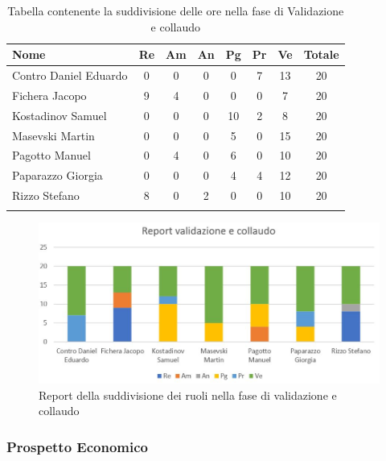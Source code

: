 \documentclass[../piano_di_progetto.tex]{subfiles}
\begin{document}
\begin{center}
	\begin{longtable}{|l|c|c|c|c|c|c|c|}
		\hline
		\rowcolor{lightgray}
		\textbf{Nome} & \textbf{Re} & \textbf{Am} & \textbf{An} & \textbf{Pg}  & \textbf{Pr}   & \textbf{Ve} & \textbf{Totale} \\

		\hline
			Contro Daniel Eduardo & 0 & 0 & 0 & 0 & 7 & 13 & 20\\
			Fichera Jacopo & 9 & 4 & 0 & 0 & 0 & 7 & 20 \\ 
			Kostadinov Samuel & 0 & 0 & 0 & 10 & 2 & 8 & 20 \\ 		
			Masevski Martin & 0 & 0 & 0 & 5 & 0 & 15 & 20 \\
			Pagotto Manuel & 0 & 4 & 0 & 6 & 0 & 10 & 20 \\			
			Paparazzo Giorgia & 0 & 0 & 0 & 4 & 4 & 12 & 20 \\
			Rizzo Stefano & 8 & 0 & 2 & 0 & 0 & 10 & 20 \\
			\hline
		\rowcolor{white}
		\caption{Tabella contenente la suddivisione delle ore nella fase di Validazione e collaudo}
	\end{longtable}
\end{center}

\begin{figure}[H]
\centering
\includegraphics[width=12cm]{img/report_valid_collaudo}
\caption{Report della suddivisione dei ruoli nella fase di validazione e collaudo}
\end{figure}

\subsubsection{Prospetto Economico}
\end{document}
